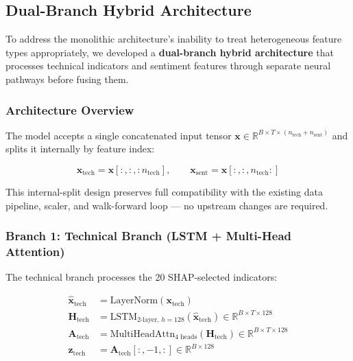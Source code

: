 \subsection{Dual-Branch Hybrid Architecture}
\label{sec:hybrid}

To address the monolithic architecture's inability to treat heterogeneous
feature types appropriately, we developed a \textbf{dual-branch hybrid
architecture} that processes technical indicators and sentiment features through
separate neural pathways before fusing them.

\subsubsection{Architecture Overview}

The model accepts a single concatenated input tensor $\mathbf{x} \in
\mathbb{R}^{B \times T \times (n_{\text{tech}} + n_{\text{sent}})}$ and splits
it internally by feature index:

\begin{equation}
  \mathbf{x}_{\text{tech}} = \mathbf{x}[:, :, :n_{\text{tech}}],\qquad
  \mathbf{x}_{\text{sent}} = \mathbf{x}[:, :, n_{\text{tech}}:]
\end{equation}

\noindent
This internal-split design preserves full compatibility with the existing data
pipeline, scaler, and walk-forward loop --- no upstream changes are required.

\subsubsection{Branch 1: Technical Branch (LSTM + Multi-Head Attention)}

The technical branch processes the 20 SHAP-selected indicators:

\begin{align}
  \hat{\mathbf{x}}_{\text{tech}} &= \text{LayerNorm}(\mathbf{x}_{\text{tech}}) \\
  \mathbf{H}_{\text{tech}} &= \text{LSTM}_{2\text{-layer, }h{=}128}
    (\hat{\mathbf{x}}_{\text{tech}})
    \in \mathbb{R}^{B \times T \times 128} \\
  \mathbf{A}_{\text{tech}} &= \text{MultiHeadAttn}_{4\text{ heads}}
    (\mathbf{H}_{\text{tech}})
    \in \mathbb{R}^{B \times T \times 128} \\
  \mathbf{z}_{\text{tech}} &= \mathbf{A}_{\text{tech}}[:, -1, :]
    \in \mathbb{R}^{B \times 128}
\end{align}

